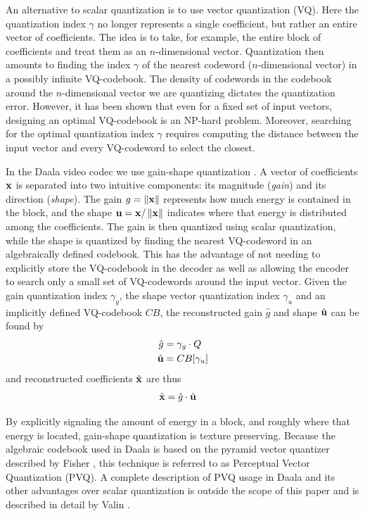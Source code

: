 \documentclass[conference, 10pt]{IEEEtran}
\begin{document}
An alternative to scalar quantization is to use vector quantization (VQ).
Here the quantization index $\gamma$ no longer represents a single coefficient,
 but rather an entire vector of coefficients.
The idea is to take, for example, the entire block of coefficients and treat
 them as an $n$-dimensional vector.
Quantization then amounts to finding the index $\gamma$ of the nearest codeword
 ($n$-dimensional vector) in a possibly infinite VQ-codebook.
The density of codewords in the codebook around the $n$-dimensional vector we
 are quantizing dictates the quantization error.
However, it has been shown that even for a fixed set of input vectors,
 designing an optimal VQ-codebook is an NP-hard problem.
Moreover, searching for the optimal quantization index $\gamma$ requires
 computing the distance between the input vector and every VQ-codeword to
 select the closest.

In the Daala video codec we use gain-shape quantization \cite{DaalaDemo6}.
A vector of coefficients ${\bf x}$ is separated into two intuitive components:
 its magnitude ({\em gain}) and its direction ({\em shape}).
The gain $g=\left\|{\bf x}\right\|$ represents how much energy is contained in the
 block, and the shape ${\bf u}={\bf x}/\left\|{\bf x}\right\|$ indicates where that energy is
 distributed among the coefficients.
The gain is then quantized using scalar quantization, while the shape is
 quantized by finding the nearest VQ-codeword in an algebraically defined
 codebook.
This has the advantage of not needing to explicitly store the VQ-codebook in
 the decoder as well as allowing the encoder to search only a small set of
 VQ-codewords around the input vector.
Given the gain quantization index $\gamma_g$, the shape vector quantization
 index $\gamma_u$ and an implicitly defined VQ-codebook $CB$, the reconstructed
 gain $\hat{g}$ and shape $\hat{{\bf u}}$ can be found by
\begin{align}
\hat{g} & = \gamma_g \cdot Q \\
\hat{{\bf u}} & = CB[{\gamma_u}]
\end{align}
and reconstructed coefficients $\hat{{\bf x}}$ are thus
\begin{align}
\hat{{\bf x}} & = \hat{g}\cdot \hat{{\bf u}}
\end{align}

By explicitly signaling the amount of energy in a block, and roughly where that
 energy is located, gain-shape quantization is texture preserving.
Because the algebraic codebook used in Daala is based on the pyramid vector
 quantizer described by Fisher \cite{Fisher1986}, this technique is referred to
 as Perceptual Vector Quantization (PVQ).
A complete description of PVQ usage in Daala and its other advantages over
 scalar quantization is outside the scope of this paper and is described
 in detail by Valin \cite{valin2015spie}.
\end{document}

